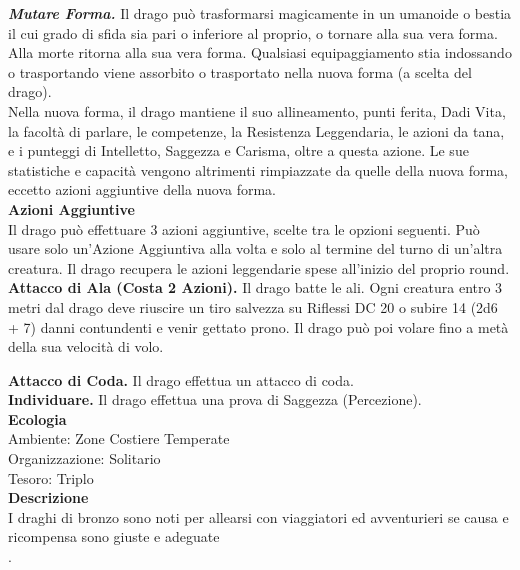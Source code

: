\begin{multicols}{2}
\emph{\textbf{Mutare Forma.}} Il drago può trasformarsi magicamente in un umanoide o bestia il cui grado di sfida sia pari o inferiore al proprio, o tornare alla sua vera forma. Alla morte ritorna alla sua vera forma. Qualsiasi equipaggiamento stia indossando o trasportando viene assorbito o trasportato nella nuova forma (a scelta del drago). \\
Nella nuova forma, il drago mantiene il suo allineamento, punti ferita, Dadi Vita, la facoltà di parlare, le competenze, la Resistenza Leggendaria, le azioni da tana, e i punteggi di Intelletto, Saggezza e Carisma, oltre a questa azione. Le sue statistiche e capacità vengono altrimenti rimpiazzate da quelle della nuova forma, eccetto azioni aggiuntive della nuova forma.\\
\textbf{Azioni Aggiuntive}\\
Il drago può effettuare 3 azioni aggiuntive, scelte tra le opzioni seguenti. Può usare solo un'Azione Aggiuntiva alla volta e solo al termine del turno di un'altra creatura. Il drago recupera le azioni leggendarie spese all'inizio del proprio round.\\

\textbf{Attacco di Ala (Costa 2 Azioni).} Il drago batte le ali. Ogni creatura entro 3 metri dal drago deve riuscire un tiro salvezza su Riflessi DC 20 o subire 14 (2d6 + 7) danni contundenti e venir gettato prono. Il drago può poi volare fino a metà della sua velocità di volo.

\textbf{Attacco di Coda.} Il drago effettua un attacco di coda.\\
\textbf{Individuare.} Il drago effettua una prova di Saggezza (Percezione).\\
\textbf{Ecologia}\\
Ambiente: Zone Costiere Temperate\\
Organizzazione: Solitario\\
Tesoro: Triplo\\
\textbf{Descrizione}\\
I draghi di bronzo sono noti per allearsi con viaggiatori ed avventurieri se causa e ricompensa sono giuste e adeguate\\
.


\end{multicols}
